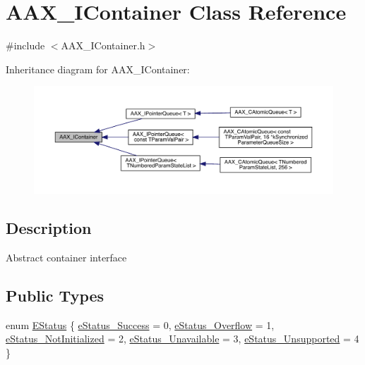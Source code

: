 \hypertarget{a01785}{}\section{A\+A\+X\+\_\+\+I\+Container Class Reference}
\label{a01785}


{\ttfamily \#include $<$A\+A\+X\+\_\+\+I\+Container.\+h$>$}



Inheritance diagram for A\+A\+X\+\_\+\+I\+Container\+:
\nopagebreak
\begin{figure}[H]
\begin{center}
\leavevmode
\includegraphics[width=350pt]{a01784}
\end{center}
\end{figure}


\subsection{Description}
Abstract container interface \subsection*{Public Types}
\begin{DoxyCompactItemize}
\item 
enum \mbox{\hyperlink{a01785_aea020100f0b06636ce7cb25c2fdb0af7}{E\+Status}} \{ \newline
\mbox{\hyperlink{a01785_aea020100f0b06636ce7cb25c2fdb0af7add595169a28f04ed79be4f1c5974eb48}{e\+Status\+\_\+\+Success}} = 0, 
\mbox{\hyperlink{a01785_aea020100f0b06636ce7cb25c2fdb0af7a977319edf1a7a788eeee29dd71982f66}{e\+Status\+\_\+\+Overflow}} = 1, 
\mbox{\hyperlink{a01785_aea020100f0b06636ce7cb25c2fdb0af7a26ef7d5d740723455d59080b273ac217}{e\+Status\+\_\+\+Not\+Initialized}} = 2, 
\mbox{\hyperlink{a01785_aea020100f0b06636ce7cb25c2fdb0af7a7586eb60b4cb29ee8ed06aa7c539fe62}{e\+Status\+\_\+\+Unavailable}} = 3, 
\newline
\mbox{\hyperlink{a01785_aea020100f0b06636ce7cb25c2fdb0af7a1585c38bb587c4adcadefbe3823ee9f8}{e\+Status\+\_\+\+Unsupported}} = 4
 \}
\end{DoxyCompactItemize}
